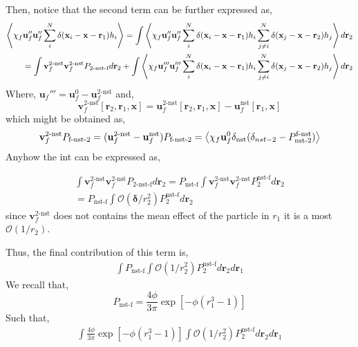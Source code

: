 Then, notice that the second term can be further expressed as, 
\begin{align}
    \left<\chi_f \textbf{u}_f''\textbf{u}_f'' 
    \sum_i^N \delta(\textbf{x}_i - \textbf{x}- \textbf{r}_1)
    h_i
    \right>
    = 
    \int 
    \left<\chi_f \textbf{u}_f''\textbf{u}_f'' 
    \sum_i^N \delta(\textbf{x}_i - \textbf{x}- \textbf{r}_1)h_i
    \sum_{j\neq i }^N \delta(\textbf{x}_j - \textbf{x}- \textbf{r}_2)h_j
    \right>
    d\textbf{r}_2\\
    =
    \int 
    \textbf{v}_f^\text{2-nst}
    \textbf{v}_f^\text{2-nst}
    P_\text{2-nst-f}
    d\textbf{r}_2
    + 
    \int 
    \left<\chi_f \textbf{u}_f'''\textbf{u}_f''' 
    \sum_i^N \delta(\textbf{x}_i - \textbf{x}- \textbf{r}_1)h_i
    \sum_{j\neq i }^N \delta(\textbf{x}_j - \textbf{x}- \textbf{r}_2)h_j
    \right>
    d\textbf{r}_2
\end{align}
Where, $\textbf{u}_f''' = \textbf{u}_f^0 - \textbf{u}_f^\text{2-nst}$ and, 
\begin{equation}
    \textbf{v}_f^\text{2-nst}[\textbf{r}_2,\textbf{r}_1,\textbf{x}]
    = 
    \textbf{u}_f^\text{2-nst}[\textbf{r}_2,\textbf{r}_1,\textbf{x}]
    - \textbf{u}_f^\text{nst}[\textbf{r}_1,\textbf{x}]
\end{equation}
which might be obtained as, 
\begin{equation}
    \textbf{v}_f^\text{2-nst} P_\text{f-nst-2}
    = 
    (
    \textbf{u}_f^\text{2-nst}
    - \textbf{u}_f^\text{nst}
    )P_\text{f-nst-2}
    = 
    \left<
        \chi_f \textbf{u}_f^0 \delta_\text{nst}
        (
            \delta_{nst-2}
            - P_\text{nst-2}^\text{f-nst}
        )
    \right>
\end{equation}
Anyhow the int can be expressed as, 

\begin{multline}
    \int 
    \textbf{v}_f^\text{2-nst}
    \textbf{v}_f^\text{2-nst}
    P_\text{2-nst-f}
    d\textbf{r}_2
    = 
    P_\text{nst-f}
    \int 
    \textbf{v}_f^\text{2-nst}
    \textbf{v}_f^\text{2-nst}
    P_2^\text{nst-f}
    d\textbf{r}_2\\
    = 
    P_\text{nst-f}
    \int 
    \mathcal{O}(\bm\delta/r_2^2)
    P_2^\text{nst-f}
    d\textbf{r}_2
\end{multline}
since $\textbf{v}_f^\text{2-nst}$ does not contains the mean effect of the particle in $r_1$ it is a most $\mathcal{O}(1/r_2)$.

Thus, the final contribution of this term is, 
\begin{multline}
    \int      P_\text{nst-f}
    \int 
    \mathcal{O}(1/r_2^2)
    P_2^\text{nst-f}
    d\textbf{r}_2
    d\textbf{r}_1
\end{multline}
We recall that, 
\begin{equation}
    P_\text{nst-f}
    = \frac{4\phi}{3\pi}
    \exp{[-\phi (r_1^3 - 1)]}
\end{equation}
Such that, 
\begin{multline}
    \int     \frac{4\phi}{3\pi}
    \exp{[-\phi (r_1^3 - 1)]}
    \int 
    \mathcal{O}(1/r_2^2)
    P_2^\text{nst-f}
    d\textbf{r}_2
    d\textbf{r}_1
\end{multline}

